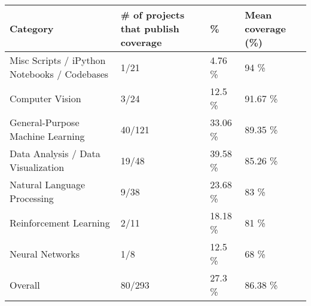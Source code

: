 \begin{table}
\centering
\begin{tabular}[t]{l|l|l|l}
\hline
Category & \# of projects that publish coverage & \% & Mean coverage (\%)\\
\hline
Misc Scripts / iPython Notebooks / Codebases & 1/21 & 4.76 \% & 94 \%\\
\hline
Computer Vision & 3/24 & 12.5 \% & 91.67 \%\\
\hline
General-Purpose Machine Learning & 40/121 & 33.06 \% & 89.35 \%\\
\hline
Data Analysis / Data Visualization & 19/48 & 39.58 \% & 85.26 \%\\
\hline
Natural Language Processing & 9/38 & 23.68 \% & 83 \%\\
\hline
Reinforcement Learning & 2/11 & 18.18 \% & 81 \%\\
\hline
Neural Networks & 1/8 & 12.5 \% & 68 \%\\
\hline
Overall & 80/293 & 27.3 \% & 86.38 \%\\
\hline
\end{tabular}
\end{table}
